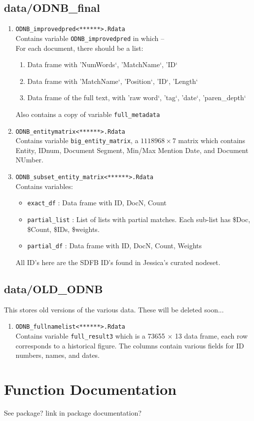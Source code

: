 \documentclass[11pt]{article}
\newcommand{\filename}[1]{\texttt{#1}}
\begin{document}
\subsection{data/ODNB\_final}
\begin{enumerate}
\item \filename{ODNB\_improvedpred<******>.Rdata} \\
Contains variable \texttt{ODNB\_improvedpred} in which -- \\
For each document, there should be a list: 
\begin{enumerate}
\item Data frame with 'NumWords`, 'MatchName`, 'ID`
\item Data frame with 'MatchName`, 'Position`, 'ID`, 'Length`
\item Data frame of the full text, with 'raw word`, 'tag`, 'date`, 'paren\_depth`
\end{enumerate} 
Also contains a copy of variable \texttt{full\_metadata}


\item \filename{ODNB\_entitymatrix<******>.Rdata} \\
Contains variable \texttt{big\_entity\_matrix}, a $1118968 \times 7$ matrix which contains Entity, IDnum, Document Segment, Min/Max Mention Date, and Document NUmber. 

\item \filename{ODNB\_subset\_entity\_matrix<******>.Rdata} \\
Contains variables:
\begin{itemize}
\item \texttt{exact\_df} : Data frame with ID, DocN, Count
\item \texttt{partial\_list} : List of lists with partial matches. Each sub-list has \$Doc, \$Count, \$IDs, \$weights. 
\item \texttt{partial\_df} : Data frame with ID, DocN, Count, Weights
\end{itemize} 
All ID's here are the SDFB ID's found in Jessica's curated nodeset. 

\end{enumerate}

\subsection{data/OLD\_ODNB}
This stores old versions of the various data. These will be deleted soon... 

\begin{enumerate}

\item \filename{ODNB\_fullnamelist<******>.Rdata} \\
Contains variable \texttt{full\_result3} which is a 73655 $\times$ 13 data frame, each row corresponds to a historical figure. The columns contain various fields for ID numbers, names, and dates. 
\end{enumerate}


\section{Function Documentation}
See package? link in package documentation?
\end{document}
